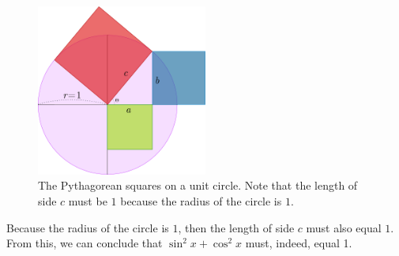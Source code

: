 \begin{figure}[h]
  \begin{center}
    \includegraphics[width=0.5\textwidth]{continuous/trig/pythcircle}
    \caption{The Pythagorean squares on a unit circle. Note that the length of side $c$ must be $1$ because the radius of the circle is $1$.}
  \end{center}
  \label{fig:pythcircle}
\end{figure}
Because the radius of the circle is $1$, then the length of side $c$ must also equal $1$.
From this, we can conclude that $\sin^2x+\cos^2x$ must, indeed, equal 1.


